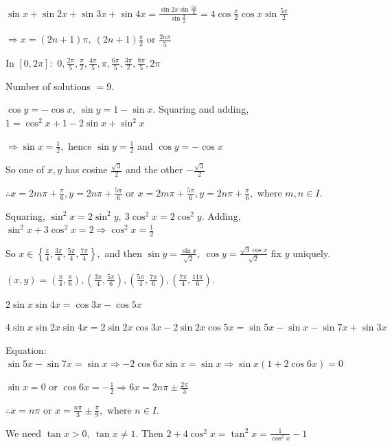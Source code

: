 \item $\sin x + \sin2x + \sin3x + \sin4x = \frac{\sin2x\sin\frac{5x}{2}}{\sin\frac{x}{2}} = 4\cos\frac{x}{2}\cos
  x\sin\frac{5x}{2}$

  $\Rightarrow x = (2n + 1)\pi,~(2n + 1)\frac{\pi}{2}$ or $\frac{2n\pi}{5}$

  In $[0, 2\pi]:$ $0, \frac{2\pi}{5}, \frac{\pi}{2}, \frac{4\pi}{5}, \pi, \frac{6\pi}{5}, \frac{3\pi}{2}, \frac{8\pi}{5},
  2\pi$

  Number of solutions $= 9.$

\item $\cos y = -\cos x,~\sin y = 1 - \sin x.$ Squaring and adding, $1 = \cos^2x + 1 - 2\sin x + \sin^2x$

  $\Rightarrow \sin x = \frac{1}{2},$ hence $\sin y = \frac{1}{2}$ and $\cos y = -\cos x$

  So one of $x, y$ has cosine $\frac{\sqrt{3}}{2}$ and the other $-\frac{\sqrt{3}}{2}$

  $\therefore x = 2m\pi + \frac{\pi}{6}, y = 2n\pi + \frac{5\pi}{6}$ or $x = 2m\pi + \frac{5\pi}{6}, y = 2n\pi +
  \frac{\pi}{6},$ where $m, n\in I.$

\item Squaring, $\sin^2x = 2\sin^2y,~3\cos^2x = 2\cos^2y.$ Adding, $\sin^2x + 3\cos^2x = 2\Rightarrow \cos^2x =
  \frac{1}{2}$

  So $x\in\left\{\frac{\pi}{4}, \frac{3\pi}{4}, \frac{5\pi}{4}, \frac{7\pi}{4}\right\},$ and then $\sin y = \frac{\sin
  x}{\sqrt{2}},~\cos y = \frac{\sqrt{3}\cos x}{\sqrt{2}}$ fix $y$ uniquely.

  $(x, y) = \left(\frac{\pi}{4}, \frac{\pi}{6}\right), \left(\frac{3\pi}{4}, \frac{5\pi}{6}\right), \left(\frac{5\pi}{4},
  \frac{7\pi}{6}\right), \left(\frac{7\pi}{4}, \frac{11\pi}{6}\right).$

\item $2\sin x\sin4x = \cos3x - \cos5x$

  $4\sin x\sin2x\sin4x = 2\sin2x\cos3x - 2\sin2x\cos5x = \sin5x - \sin x - \sin7x + \sin3x$

  Equation: $\sin5x - \sin7x = \sin x \Rightarrow -2\cos6x\sin x = \sin x \Rightarrow \sin x(1 + 2\cos6x) = 0$

  $\sin x = 0$ or $\cos6x = -\frac{1}{2}\Rightarrow 6x = 2n\pi\pm\frac{2\pi}{3}$

  $\therefore x = n\pi$ or $x = \frac{n\pi}{3}\pm\frac{\pi}{9},$ where $n\in I.$

\item We need $\tan x > 0,~\tan x\neq 1.$ Then $2 + 4\cos^2x = \tan^2x = \frac{1}{\cos^2x} - 1$

